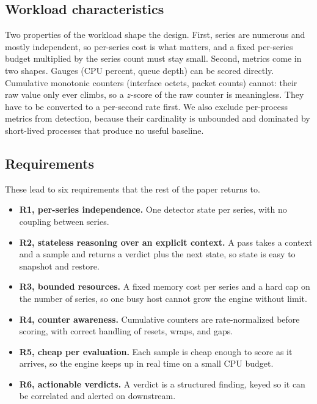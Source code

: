 \subsection{Workload characteristics}
Two properties of the workload shape the design. First, series are numerous and
mostly independent, so per-series cost is what matters, and a fixed per-series
budget multiplied by the series count must stay small. Second, metrics come in two
shapes. Gauges (CPU percent, queue depth) can be scored directly. Cumulative
monotonic counters (interface octets, packet counts) cannot: their raw value only
ever climbs, so a $z$-score of the raw counter is meaningless. They have to be
converted to a per-second rate first. We also exclude per-process metrics from
detection, because their cardinality is unbounded and dominated by short-lived
processes that produce no useful baseline.

\subsection{Requirements}
These lead to six requirements that the rest of the paper returns to.
\begin{itemize}
  \item \textbf{R1, per-series independence.} One detector state per series, with
        no coupling between series.
  \item \textbf{R2, stateless reasoning over an explicit context.} A pass takes a
        context and a sample and returns a verdict plus the next state, so state is
        easy to snapshot and restore.
  \item \textbf{R3, bounded resources.} A fixed memory cost per series and a hard
        cap on the number of series, so one busy host cannot grow the engine
        without limit.
  \item \textbf{R4, counter awareness.} Cumulative counters are rate-normalized
        before scoring, with correct handling of resets, wraps, and gaps.
  \item \textbf{R5, cheap per evaluation.} Each sample is cheap enough to score as
        it arrives, so the engine keeps up in real time on a small CPU budget.
  \item \textbf{R6, actionable verdicts.} A verdict is a structured finding, keyed
        so it can be correlated and alerted on downstream.
\end{itemize}
